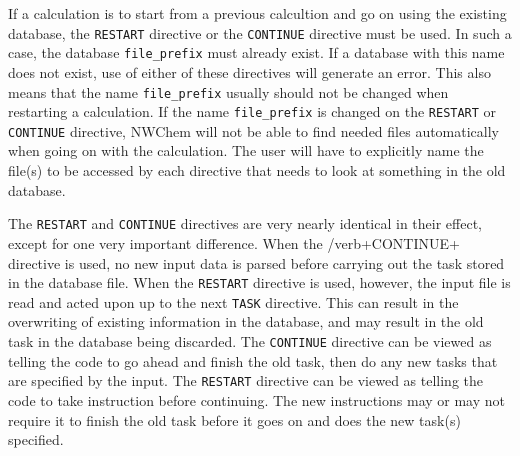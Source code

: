 If a calculation is to start from a previous calcultion and go on
using the existing database, the \verb+RESTART+ directive or the
\verb+CONTINUE+ directive must be used.  In such a case, the database
\verb+file_prefix+ must already exist.  If a database with this name 
does not exist, use of either of these directives will generate an error.
This also means that the name {\tt file_prefix} usually should not be 
changed when restarting a calculation.  If the name {\tt file_prefix} is 
changed on the \verb+RESTART+ or \verb+CONTINUE+ directive, 
NWChem will not be able to
find needed files automatically when going on with the calculation.
The user will have to explicitly name the file(s) to be accessed by each
directive that needs to look at something in the old database.

The \verb+RESTART+ and \verb+CONTINUE+ directives are very nearly identical
in their effect, except for one very important difference.  When the
/verb+CONTINUE+ directive is used, no new input data is parsed before
carrying out the task stored in the database file.  When the \verb+RESTART+
directive is used, however, the input file is read and acted upon up to
the next \verb+TASK+ directive.  This can result in the overwriting of
existing information in the database, and may result in the old task in
the database being discarded.
% 
The \verb+CONTINUE+ directive can be viewed as telling the code to
go ahead and finish the old task, then do any new tasks that are
specified by the input. The \verb+RESTART+ directive can 
be viewed as telling the code to take instruction before continuing.  The
new instructions may or may not require it to finish the old task before 
it goes on and does the new task(s) specified.

